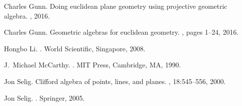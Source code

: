 \documentclass[12pt]{article}
\begin{document}
\begin{thebibliography}{Gun16b}
Charles Gunn.
\newblock Doing euclidean plane geometry using projective geometric algebra.
, 2016.

Charles Gunn.
\newblock Geometric algebras for euclidean geometry.
, pages 1--24, 2016.

Hongbo Li.
.
\newblock World Scientific, Singapore, 2008.

J.~Michael McCarthy.
.
\newblock MIT Press, Cambridge, MA, 1990.

Jon Selig.
\newblock Clifford algebra of points, lines, and planes.
, 18:545--556, 2000.

Jon Selig.
.
\newblock Springer, 2005.

\end{thebibliography}
\end{document}
